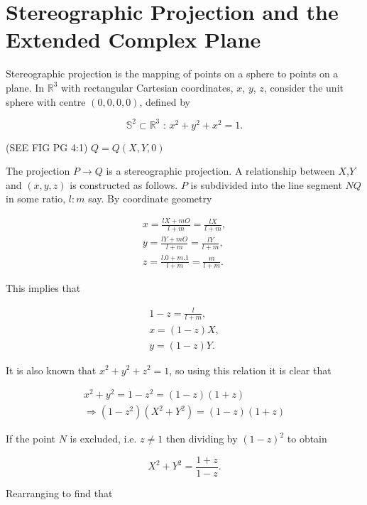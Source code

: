 \section{Stereographic Projection and the Extended Complex Plane}\label{Section_Stereographic_Extended_Complex}

Stereographic projection is the mapping of points on a sphere to points on a plane. In $\mathbb{R}^3$ with rectangular Cartesian coordinates, $x$, $y$, $z$, consider the unit sphere with centre $(0,0,0,0)$, defined by

\begin{equation*}
\mathbb{S}^2 \subset \mathbb{R}^3 \text{ : } x^2 + y^2 + x^2 = 1.
\end{equation*}

(SEE FIG PG 4:1) $Q = Q(X,Y,0)$

\noindent The projection $P \rightarrow Q$ is a stereographic projection. A relationship between $X$,$Y$ and $(x,y,z)$ is constructed as follows. $P$ is subdivided into the line segment $NQ$ in some ratio, $l:m$ say. By coordinate geometry

\begin{eqnarray*}  
x = \frac{lX + mO}{l+m} = \frac{lX}{l+m}, \\
y = \frac{lY + mO}{l+m} = \frac{lY}{l+m}, \\
z = \frac{l.0+ m.1}{l+m} = \frac{m}{l+m}.
\end{eqnarray*}

\noindent This implies that

\begin{eqnarray*}
1-z = \frac{l}{l+m}, \\
x = (1-z)X, \\
y = (1-z)Y.
\end{eqnarray*}

\noindent It is also known that $x^2+ y^2 +z^2 = 1$, so using this relation it is clear that

\begin{eqnarray*}
x^2 + y^2 = 1-z^2 = (1-z) (1+z) \\
\Rightarrow (1-z^2)(X^2 +Y^2) = (1-z) (1+z)
\end{eqnarray*}

\noindent If the point $N$ is excluded, i.e. $z \neq 1$ then dividing by $(1-z)^2$ to obtain

\begin{equation*} 
X^2 + Y^2 = \frac{1+z}{1-z}.
\end{equation*}

\noindent Rearranging to find that

